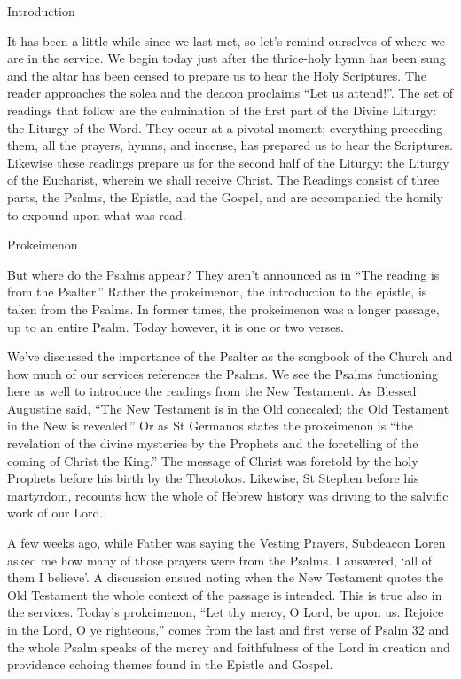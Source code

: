 \documentclass[
]{article}
\begin{document}
Introduction

It has been a little while since we last met, so let's remind ourselves
of where we are in the service. We begin today just after the
thrice-holy hymn has been sung and the altar has been censed to prepare
us to hear the Holy Scriptures. The reader approaches the solea and the
deacon proclaims ``Let us attend!''. The set of readings that follow are
the culmination of the first part of the Divine Liturgy: the Liturgy of
the Word. They occur at a pivotal moment; everything preceding them, all
the prayers, hymns, and incense, has prepared us to hear the Scriptures.
Likewise these readings prepare us for the second half of the Liturgy:
the Liturgy of the Eucharist, wherein we shall receive Christ. The
Readings consist of three parts, the Psalms, the Epistle, and the
Gospel, and are accompanied the homily to expound upon what was read.

Prokeimenon

But where do the Psalms appear? They aren't announced as in ``The
reading is from the Psalter.'' Rather the prokeimenon, the introduction
to the epistle, is taken from the Psalms. In former times, the
prokeimenon was a longer passage, up to an entire Psalm. Today however,
it is one or two verses.

We've discussed the importance of the Psalter as the songbook of the
Church and how much of our services references the Psalms. We see the
Psalms functioning here as well to introduce the readings from the New
Testament. As Blessed Augustine said, ``The New Testament is in the Old
concealed; the Old Testament in the New is revealed.'' Or as St Germanos
states the prokeimenon is ``the revelation of the divine mysteries by
the Prophets and the foretelling of the coming of Christ the King.'' The
message of Christ was foretold by the holy Prophets before his birth by
the Theotokos. Likewise, St Stephen before his martyrdom, recounts how
the whole of Hebrew history was driving to the salvific work of our
Lord.

A few weeks ago, while Father was saying the Vesting Prayers, Subdeacon
Loren asked me how many of those prayers were from the Psalms. I
answered, `all of them I believe'. A discussion ensued noting when the
New Testament quotes the Old Testament the whole context of the passage
is intended. This is true also in the services. Today's prokeimenon,
``Let thy mercy, O Lord, be upon us. Rejoice in the Lord, O ye
righteous,'' comes from the last and first verse of Psalm 32 and the
whole Psalm speaks of the mercy and faithfulness of the Lord in creation
and providence echoing themes found in the Epistle and Gospel.
\end{document}
